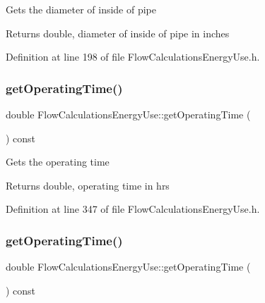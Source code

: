 Gets the diameter of inside of pipe

\begin{DoxyReturn}{Returns}
double, diameter of inside of pipe in inches 
\end{DoxyReturn}


Definition at line 198 of file Flow\+Calculations\+Energy\+Use.\+h.

\mbox{\label{class_flow_calculations_energy_use_ab44c6cad4825e30f5599f18fcbfbb873}} 
\subsubsection{\texorpdfstring{get\+Operating\+Time()}{getOperatingTime()}\hspace{0.1cm}{\footnotesize\ttfamily [1/3]}}
{\footnotesize\ttfamily double Flow\+Calculations\+Energy\+Use\+::get\+Operating\+Time (\begin{DoxyParamCaption}{ }\end{DoxyParamCaption}) const\hspace{0.3cm}{\ttfamily [inline]}}

Gets the operating time

\begin{DoxyReturn}{Returns}
double, operating time in hrs 
\end{DoxyReturn}


Definition at line 347 of file Flow\+Calculations\+Energy\+Use.\+h.

\mbox{\label{class_flow_calculations_energy_use_ab44c6cad4825e30f5599f18fcbfbb873}} 
\subsubsection{\texorpdfstring{get\+Operating\+Time()}{getOperatingTime()}\hspace{0.1cm}{\footnotesize\ttfamily [2/3]}}
{\footnotesize\ttfamily double Flow\+Calculations\+Energy\+Use\+::get\+Operating\+Time (\begin{DoxyParamCaption}{ }\end{DoxyParamCaption}) const\hspace{0.3cm}{\ttfamily [inline]}}

